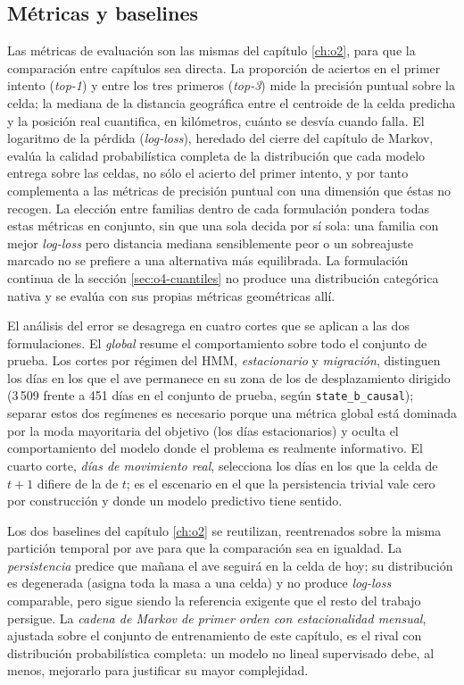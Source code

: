 \subsection{Métricas y baselines}
\label{sec:o4-metricas}

Las métricas de evaluación son las mismas del capítulo \ref{ch:o2}, para que la
comparación entre capítulos sea directa. La proporción de aciertos en el primer
intento (\textit{top-1}) y entre los tres primeros (\textit{top-3}) mide la precisión
puntual sobre la celda; la mediana de la distancia geográfica entre el centroide de la
celda predicha y la posición real cuantifica, en kilómetros, cuánto se desvía cuando
falla. El logaritmo de la pérdida (\textit{log-loss}), heredado del cierre del capítulo de
Markov, evalúa la calidad probabilística completa de la distribución que cada modelo
entrega sobre las celdas, no sólo el acierto del primer intento, y por tanto complementa
a las métricas de precisión puntual con una dimensión que éstas no recogen. La elección
entre familias dentro de cada formulación pondera todas estas métricas en conjunto,
sin que una sola decida por sí sola: una familia con mejor \textit{log-loss} pero
distancia mediana sensiblemente peor o un sobreajuste marcado no se prefiere a una
alternativa más equilibrada. La formulación continua de la sección
\ref{sec:o4-cuantiles} no produce una distribución categórica nativa y se evalúa con
sus propias métricas geométricas allí.

El análisis del error se desagrega en cuatro cortes que se aplican a las dos
formulaciones. El \emph{global} resume el comportamiento sobre todo el conjunto de
prueba. Los cortes por régimen del HMM, \emph{estacionario} y \emph{migración},
distinguen los días en los que el ave permanece en su zona de los de desplazamiento
dirigido (3\,509 frente a 451 días en el conjunto de prueba, según
\texttt{state\_b\_causal}); separar estos dos regímenes es necesario porque una
métrica global está dominada por la moda mayoritaria del objetivo (los días
estacionarios) y oculta el comportamiento del modelo donde el problema es realmente
informativo. El cuarto corte, \emph{días de movimiento real}, selecciona los días en
los que la celda de $t+1$ difiere de la de $t$; es el escenario en el que la
persistencia trivial vale cero por construcción y donde un modelo predictivo tiene
sentido.

Los dos baselines del capítulo \ref{ch:o2} se reutilizan, reentrenados sobre la misma
partición temporal por ave para que la comparación sea en igualdad. La
\emph{persistencia} predice que mañana el ave seguirá en la celda de hoy; su
distribución es degenerada (asigna toda la masa a una celda) y no produce
\textit{log-loss} comparable, pero sigue siendo la referencia exigente que el resto
del trabajo persigue. La \emph{cadena de Markov de primer orden con estacionalidad
mensual}, ajustada sobre el conjunto de entrenamiento de este capítulo, es el rival
con distribución probabilística completa: un modelo no lineal supervisado debe, al
menos, mejorarlo para justificar su mayor complejidad.

